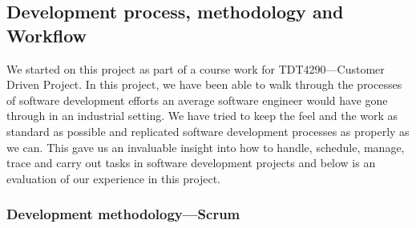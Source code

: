 \subsection{Development process, methodology and Workflow}

We started on this project as part of a course work for TDT4290---Customer Driven Project. In this project, we have been able to walk through the processes of software development efforts an average software engineer would have gone through in an industrial setting. We have tried to keep the feel and the work as standard as possible and replicated software development processes as properly as we can. This gave us an invaluable insight into how to handle, schedule, manage, trace and carry out tasks in software development projects and below is an evaluation of our experience in this project.
	\subsubsection{Development methodology---Scrum}

